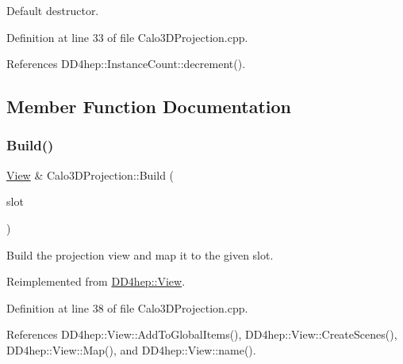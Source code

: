 Default destructor. 



Definition at line 33 of file Calo3\+D\+Projection.\+cpp.



References D\+D4hep\+::\+Instance\+Count\+::decrement().



\subsection{Member Function Documentation}
\hypertarget{class_d_d4hep_1_1_calo3_d_projection_a2f0865f08b8eedfc84323b8a280d1216}{}\label{class_d_d4hep_1_1_calo3_d_projection_a2f0865f08b8eedfc84323b8a280d1216} 
\subsubsection{\texorpdfstring{Build()}{Build()}}
{\footnotesize\ttfamily \hyperlink{class_d_d4hep_1_1_view}{View} \& Calo3\+D\+Projection\+::\+Build (\begin{DoxyParamCaption}\item[{T\+Eve\+Window $\ast$}]{slot }\end{DoxyParamCaption})\hspace{0.3cm}{\ttfamily [virtual]}}



Build the projection view and map it to the given slot. 



Reimplemented from \hyperlink{class_d_d4hep_1_1_view_ab4e12874a9cb6a599f268b027443c6ce}{D\+D4hep\+::\+View}.



Definition at line 38 of file Calo3\+D\+Projection.\+cpp.



References D\+D4hep\+::\+View\+::\+Add\+To\+Global\+Items(), D\+D4hep\+::\+View\+::\+Create\+Scenes(), D\+D4hep\+::\+View\+::\+Map(), and D\+D4hep\+::\+View\+::name().

\hypertarget{class_d_d4hep_1_1_calo3_d_projection_a4696a6c764ceaf1307e6459c24cd7d1f}{}\label{class_d_d4hep_1_1_calo3_d_projection_a4696a6c764ceaf1307e6459c24cd7d1f} 
